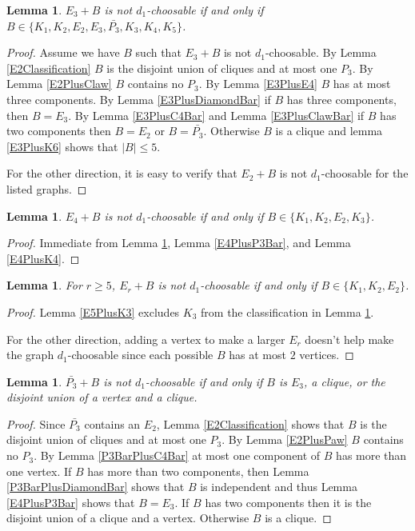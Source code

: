 \documentclass[12pt]{article}
\theoremstyle{plain}
\newtheorem{lem}[thm]{Lemma}
\theoremstyle{definition}
\theoremstyle{remark}
\begin{document}
\begin{lem}\label{E3Classification}
$E_3 + B$ is not $d_1$-choosable if and only if $B \in \{K_1,K_2,E_2,E_3,\bar{P_3},K_3,K_4,K_5\}$.
\end{lem}
\begin{proof}
Assume we have $B$ such that $E_3 + B$ is not $d_1$-choosable. By Lemma \ref{E2Classification} $B$ is the disjoint union of cliques and at most one $P_3$.  By Lemma \ref{E2PlusClaw} $B$ contains no $P_3$.  By Lemma \ref{E3PlusE4} $B$ has at most three components.  By Lemma \ref{E3PlusDiamondBar} if $B$ has three components, then $B = E_3$.  By Lemma \ref{E3PlusC4Bar} and Lemma \ref{E3PlusClawBar} if $B$ has two components then $B = E_2$ or $B = \bar{P_3}$.  Otherwise $B$ is a clique and lemma \ref{E3PlusK6} shows that $|B| \leq 5$.\newline

For the other direction, it is easy to verify that $E_2 + B$ is not $d_1$-choosable for the listed graphs.
\end{proof}

\begin{lem}\label{E4Classification}
$E_4 + B$ is not $d_1$-choosable if and only if $B \in \{K_1, K_2, E_2, K_3\}$.
\end{lem}
\begin{proof}
Immediate from Lemma \ref{E3Classification}, Lemma \ref{E4PlusP3Bar}, and Lemma \ref{E4PlusK4}.
\end{proof}

\begin{lem}\label{E5Classification}
For $r\geq 5$, $E_r + B$ is not $d_1$-choosable if and only if $B \in \{K_1, K_2, E_2\}$.
\end{lem}
\begin{proof}
Lemma \ref{E5PlusK3} excludes $K_3$ from the classification in Lemma \ref{E4Classification}.\newline

For the other direction, adding a vertex to make a larger $E_r$ doesn't help make the graph $d_1$-choosable since each possible $B$ has at most $2$ vertices.
\end{proof}

\begin{lem}\label{P3ComplementClassification}
$\bar{P_3} + B$ is not $d_1$-choosable if and only if $B$ is $E_3$, a clique, or the disjoint union of a vertex and a clique.
\end{lem}
\begin{proof}
Since $\bar{P_3}$ contains an $E_2$, Lemma \ref{E2Classification} shows that $B$ is the disjoint union of cliques and at most one $P_3$.  By Lemma \ref{E2PlusPaw} $B$ contains no $P_3$.  By Lemma \ref{P3BarPlusC4Bar} at most one component of $B$ has more than one vertex.  If $B$ has more than two components, then Lemma \ref{P3BarPlusDiamondBar} shows that $B$ is independent and thus Lemma \ref{E4PlusP3Bar} shows that $B = E_3$.  If $B$ has two components then it is the disjoint union of a clique and a vertex.  Otherwise $B$ is a clique.
\end{proof}
\end{document}
